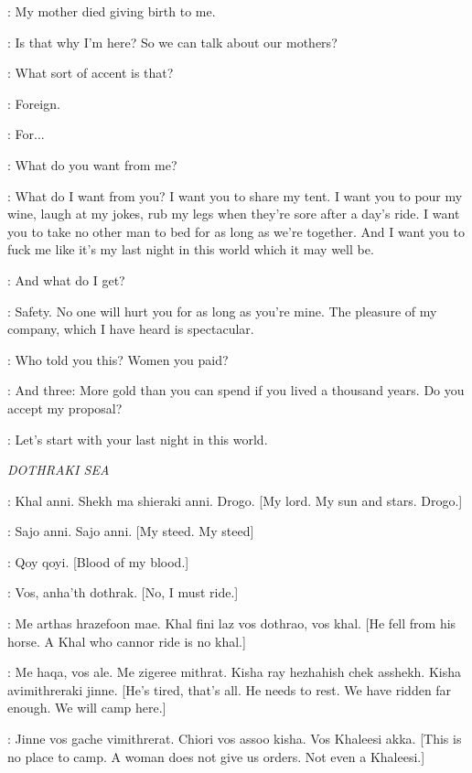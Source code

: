 \TYRION: My mother died giving birth to me. 

\SHAE: Is that why I'm here? So we can talk about our mothers? 

\TYRION: What sort of accent is that? 

\SHAE: Foreign. 

\TYRION: For...

\SHAE: What do you want from me? 

\TYRION: What do I want from you? I want you to share my tent. I want you to pour my wine, laugh at my jokes, rub my legs when they're sore after a day's ride. I want you to take no other man to bed for as long as we're together. And I want you to fuck me like it's my last night in this world which it may well be. 

\SHAE: And what do I get? 

\TYRION: Safety. No one will hurt you for as long as you're mine. The pleasure of my company, which I have heard is spectacular. 

\SHAE: Who told you this? Women you paid? 

\TYRION: And three: More gold than you can spend if you lived a thousand years. Do you accept my proposal? 

\SHAE: Let's start with your last night in this world. 


\scene

\textit{DOTHRAKI SEA} 


\DAENERYS: Khal anni. Shekh ma shieraki anni. Drogo. [My lord. My sun and stars. Drogo.] 


\DROGO: Sajo anni. Sajo anni. [My steed. My steed] 

\HAGGO: Qoy qoyi. [Blood of my blood.] 

\DROGO: Vos, anha'th dothrak. [No, I must ride.] 

\QOTHO: Me arthas hrazefoon mae. Khal fini laz vos dothrao, vos khal.  [He fell from his horse. A Khal who cannor ride is no khal.] 

\DAENERYS: Me haqa, vos ale. Me zigeree mithrat. Kisha ray hezhahish chek asshekh. Kisha avimithreraki jinne. [He's tired, that's all. He needs to rest. We have ridden far enough. We will camp here.] 

\QOTHO: Jinne vos gache vimithrerat. Chiori vos assoo kisha. Vos Khaleesi akka. [This is no place to camp. A woman does not give us orders. Not even a Khaleesi.] 

